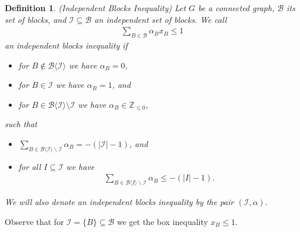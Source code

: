 \documentclass[12pt]{amsart}
\newtheorem{definition}[theorem]{Definition}
\newcommand{\Z}{\mathbb{Z}}
\newcommand{\I}{\mathcal{I}}
\newcommand{\B}{\mathcal{B}}
\begin{document}
\begin{definition}(Independent Blocks Inequality)
    Let $G$ be a connected graph, $\B$ its set of blocks, and $\I \subseteq \B$ an independent set of blocks. We call
    \begin{align}
        \label{ineqindcyc}
        \sum_{B \in \B}\alpha_Bx_B \le 1
    \end{align}
    an \emph{independent blocks inequality} if
    \begin{itemize}
        \item for $B \notin \B\langle \I \rangle$ we have $\alpha_B=0$,
        \item for $B \in \I$ we have $\alpha_B=1$, and
        \item for $B \in \B\langle \I \rangle \setminus \I$ we have $\alpha_B \in \Z_{\le 0}$,
    \end{itemize}
    such that
    \begin{itemize}
        \item $\sum_{B \in \B\langle\I\rangle \backslash \I}\alpha_B=-(\vert \I \vert-1)$, and
        \item for all $I \subseteq \I$ we have
        \begin{align}
            \sum_{B \in \B\langle I\rangle\backslash \I}\alpha_B \le -(\vert I \vert-1).
            \label{condIBI}
        \end{align}
    \end{itemize}
We will also denote an independent blocks inequality by the pair $(\I,\alpha)$.
\end{definition}

Observe that for $\I=\{B\} \subseteq \B$ we get the box inequality $x_B \le 1$.
\end{document}
